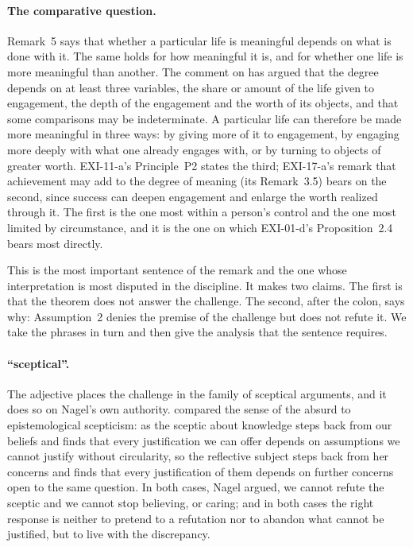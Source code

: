 \paragraph{The comparative question.} Remark~5 says that whether a particular life is meaningful depends on what is done with it. The same holds for how meaningful it is, and for whether one life is more meaningful than another. The comment on  has argued that the degree depends on at least three variables, the share or amount of the life given to engagement, the depth of the engagement and the worth of its objects, and that some comparisons may be indeterminate. A particular life can therefore be made more meaningful in three ways: by giving more of it to engagement, by engaging more deeply with what one already engages with, or by turning to objects of greater worth. EXI-11-a's Principle~P2 states the third; EXI-17-a's remark that achievement may add to the degree of meaning (its Remark~3.5) bears on the second, since success can deepen engagement and enlarge the worth realized through it. The first is the one most within a person's control and the one most limited by circumstance, and it is the one on which EXI-01-d's Proposition~2.4 bears most directly.


This is the most important sentence of the remark and the one whose interpretation is most disputed in the discipline. It makes two claims. The first is that the theorem does not answer the challenge. The second, after the colon, says why: Assumption~2 denies the premise of the challenge but does not refute it. We take the phrases in turn and then give the analysis that the sentence requires.


\paragraph{\enquote{sceptical}.} The adjective places the challenge in the family of sceptical arguments, and it does so on Nagel's own authority. \citet{Nagel1971} compared the sense of the absurd to epistemological scepticism: as the sceptic about knowledge steps back from our beliefs and finds that every justification we can offer depends on assumptions we cannot justify without circularity, so the reflective subject steps back from her concerns and finds that every justification of them depends on further concerns open to the same question. In both cases, Nagel argued, we cannot refute the sceptic and we cannot stop believing, or caring; and in both cases the right response is neither to pretend to a refutation nor to abandon what cannot be justified, but to live with the discrepancy.

